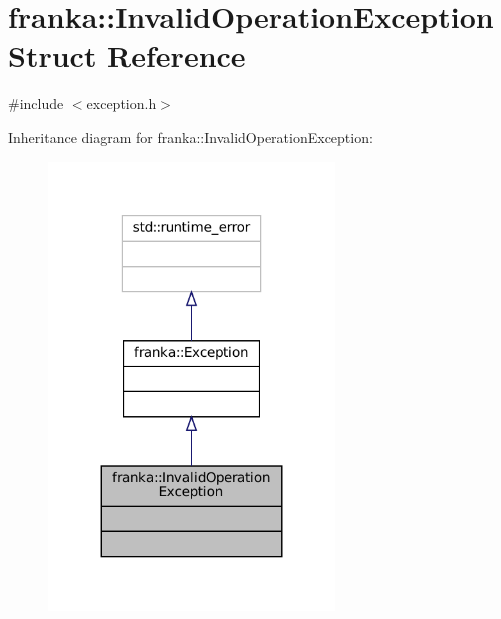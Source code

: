 \hypertarget{structfranka_1_1InvalidOperationException}{}\section{franka\+:\+:Invalid\+Operation\+Exception Struct Reference}
\label{structfranka_1_1InvalidOperationException}


{\ttfamily \#include $<$exception.\+h$>$}



Inheritance diagram for franka\+:\+:Invalid\+Operation\+Exception\+:
\nopagebreak
\begin{figure}[H]
\begin{center}
\leavevmode
\includegraphics[width=215pt]{structfranka_1_1InvalidOperationException__inherit__graph}
\end{center}
\end{figure}


